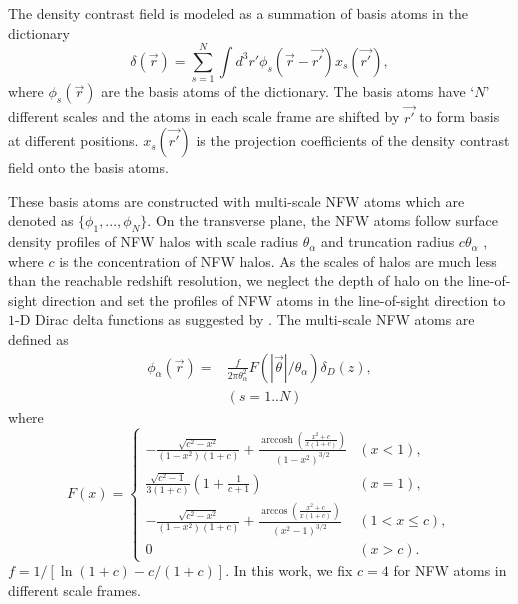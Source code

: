 \documentclass[twocolumn]{aastex62}
\DeclareMathOperator{\arccosh}{arccosh}
\begin{document}
The density contrast field is modeled as a summation of basis atoms in the dictionary 
\begin{equation}\label{eq-x2delta}
\delta(\vec{r}) = \sum_{s=1}^{N} \int d^3 r' \phi_s(\vec{r}-\vec{r'}) x_s(\vec{r'}),
\end{equation}
where $\phi_s(\vec{r})$ are the basis atoms of the dictionary. The basis atoms have `$N$' different scales and the atoms
in each scale frame are shifted by $\vec{r'}$ to form basis at different positions. $x_s(\vec{r'})$ is the projection 
coefficients of the density contrast field onto the basis atoms.

These basis atoms are constructed with multi-scale NFW atoms which are denoted as $\{\phi_1,...,\phi_N\}$.
On the transverse plane, the NFW atoms follow surface density profiles of NFW halos
\citep{haloModel-TJ2003-3pt} with scale radius $\theta_\alpha$ and truncation radius $c \theta_\alpha$ ,
where $c$ is the concentration of NFW halos.
As the scales of halos are much less than the reachable redshift resolution, we neglect the depth of halo on the
line-of-sight direction and set the profiles of NFW atoms in the line-of-sight direction to $1$-D Dirac delta 
functions as suggested by \citep{LSS-massMap-Glimpse3D-Leonard2014}. 
The multi-scale NFW atoms are defined as
\begin{equation}
\begin{split}
\phi_\alpha(\vec{r}) =&\frac{f }{2 \pi \theta_\alpha^2 } F(|\vec{\theta}|/\theta_\alpha) \delta_D(z),\\
&  (s=1..N)
\end{split}
\end{equation}
where
\begin{equation}
F(x)=
\begin{cases}
-\frac{\sqrt{c^2-x^2}}{(1-x^2)(1+c)} + \frac{\arccosh \left(\frac{x^2+c}{x(1+c)}\right)}{(1-x^2)^{3/2}}  & (x<1),\\
\frac{\sqrt{c^2-1}}{3(1+c)} (1+\frac{1}{c+1}) & (x=1),\\
-\frac{\sqrt{c^2-x^2}}{(1-x^2)(1+c)} + \frac{\arccos\left(\frac{x^2+c}{x(1+c)}\right)}{(x^2-1)^{3/2}} & (1<x\leq c),\\
0& (x>c).
\end{cases}
\end{equation}
$f=1/[\ln (1+c)-c/(1+c)]$. In this work, we fix $c=4$ for NFW atoms in different scale frames.
\end{document}

